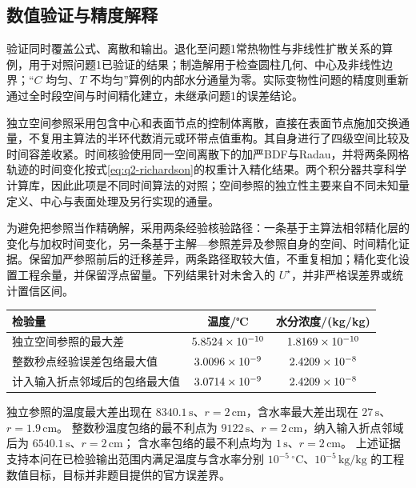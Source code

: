 \subsection{数值验证与精度解释}

验证同时覆盖公式、离散和输出。退化至问题1常热物性与非线性扩散关系的算例，用于对照问题1已验证的结果；制造解用于检查圆柱几何、中心及非线性边界；“\(C\) 均匀、\(T\) 不均匀”算例的内部水分通量为零。实际变物性问题的精度则重新通过全时段空间与时间精化建立，未继承问题1的误差结论。

独立空间参照采用包含中心和表面节点的控制体离散，直接在表面节点施加交换通量，不复用主算法的半环代数消元或环带点值重构。其自身进行了四级空间比较及时间容差收紧。时间核验使用同一空间离散下的加严BDF与Radau，并将两条网格轨迹的时间变化按式\eqref{eq:q2-richardson}的权重计入精化结果。两个积分器共享科学计算库，因此此项是不同时间算法的对照；空间参照的独立性主要来自不同未知量定义、中心与表面处理及另行实现的通量。

为避免把参照当作精确解，采用两条经验核验路径：一条基于主算法相邻精化层的变化与加权时间变化，另一条基于主解—参照差异及参照自身的空间、时间精化证据。保留加严参照前后的迁移差异，两条路径取较大值，不重复相加；精化变化设置工程余量，并保留浮点留量。下列结果针对未舍入的 \(U^\star\)，并非严格误差界或统计置信区间。

\begin{center}
\small
\setlength{\tabcolsep}{7pt}
\renewcommand{\arraystretch}{1.18}
\begin{tabular}{lcc}
\toprule
检验量 & 温度/℃ & 水分浓度/(kg/kg)\\
\midrule
独立空间参照的最大差 & \(5.8524\times10^{-10}\) & \(1.8169\times10^{-10}\)\\
整数秒点经验误差包络最大值 & \(3.0096\times10^{-9}\) & \(2.4209\times10^{-8}\)\\
计入输入折点邻域后的包络最大值 & \(3.0714\times10^{-9}\) & \(2.4209\times10^{-8}\)\\
\bottomrule
\end{tabular}
\end{center}

独立参照的温度最大差出现在 \(8340.1\,\mathrm s\)、\(r=2\,\mathrm{cm}\)，含水率最大差出现在 \(27\,\mathrm s\)、\(r=1.9\,\mathrm{cm}\)。
整数秒温度包络的最不利点为 \(9122\,\mathrm s\)、\(r=2\,\mathrm{cm}\)，纳入输入折点邻域后为 \(6540.1\,\mathrm s\)、\(r=2\,\mathrm{cm}\)；
含水率包络的最不利点均为 \(1\,\mathrm s\)、\(r=2\,\mathrm{cm}\)。
上述证据支持本问在已检验输出范围内满足温度与含水率分别 \(10^{-5}\,^{\circ}\mathrm C\)、\(10^{-5}\,\mathrm{kg/kg}\) 的工程数值目标，目标并非题目提供的官方误差界。

